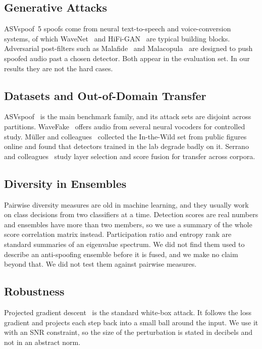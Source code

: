 \documentclass[twocolumn,a4paper,11pt]{article}
\begin{document}
\subsection{Generative Attacks}

ASVspoof~5 spoofs come from neural text-to-speech and voice-conversion
systems, of which WaveNet~\cite{wavenet} and HiFi-GAN~\cite{hifigan} are
typical building blocks. Adversarial post-filters such as Malafide~\cite{malafide}
and Malacopula~\cite{malacopula} are designed to push spoofed audio past a
chosen detector. Both appear in the evaluation set. In our results they are
not the hard cases.

\subsection{Datasets and Out-of-Domain Transfer}

ASVspoof~\cite{asvspoof2019,asvspoof2021,liu2023asvspoof,asvspoof5} is the
main benchmark family, and its attack sets are disjoint across partitions.
WaveFake~\cite{wavefake} offers audio from several neural vocoders for
controlled study. M\"{u}ller and colleagues~\cite{intothewild} collected the
In-the-Wild set from public figures online and found that detectors trained in
the lab degrade badly on it. Serrano and colleagues~\cite{serrano2025} study
layer selection and score fusion for transfer across corpora.

\subsection{Diversity in Ensembles}

Pairwise diversity measures are old in machine learning, and they usually work
on class decisions from two classifiers at a time. Detection scores are
real numbers and ensembles have more than two members, so we use a summary
of the whole score correlation matrix instead. Participation ratio and entropy
rank are standard summaries of an eigenvalue spectrum. We did not find them
used to describe an anti-spoofing ensemble before it is fused, and we make no
claim beyond that. We did not test them against pairwise measures.

\subsection{Robustness}

Projected gradient descent~\cite{madry2018} is the standard white-box attack.
It follows the loss gradient and projects each step back into a small ball
around the input. We use it with an SNR constraint, so the size of the
perturbation is stated in decibels and not in an abstract norm.
\end{document}
